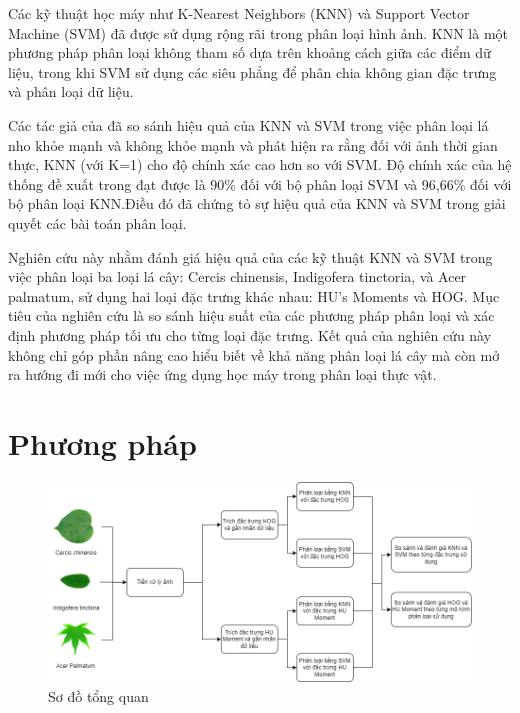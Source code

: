 \documentclass[a4paper]{article}
\begin{document}
Các kỹ thuật học máy như K-Nearest Neighbors (KNN) và Support Vector Machine (SVM) đã được sử dụng rộng rãi trong phân loại hình ảnh. KNN là một phương pháp phân loại không tham số dựa trên khoảng cách giữa các điểm dữ liệu, trong khi SVM sử dụng các siêu phẳng để phân chia không gian đặc trưng và phân loại dữ liệu.

Các tác giả của \cite{svm-and-knn} đã so sánh hiệu quả của KNN và SVM trong việc phân loại lá nho khỏe mạnh và không khỏe mạnh và phát hiện ra rằng đối với ảnh thời gian thực, KNN (với K=1) cho độ chính xác cao hơn so với SVM. Độ chính xác của hệ thống đề xuất trong \cite{svm-and-knn} đạt được là 90\% đối với bộ phân loại SVM và 96,66\% đối với bộ phân loại KNN.Điều đó đã chứng tỏ sự hiệu quả của KNN và SVM trong giải quyết các bài toán phân loại. 

Nghiên cứu này nhằm đánh giá hiệu quả của các kỹ thuật KNN và SVM trong việc phân loại ba loại lá cây: Cercis chinensis, Indigofera tinctoria, và Acer palmatum, sử dụng hai loại đặc trưng khác nhau: HU's Moments và HOG. Mục tiêu của nghiên cứu là so sánh hiệu suất của các phương pháp phân loại và xác định phương pháp tối ưu cho từng loại đặc trưng. Kết quả của nghiên cứu này không chỉ góp phần nâng cao hiểu biết về khả năng phân loại lá cây mà còn mở ra hướng đi mới cho việc ứng dụng học máy trong phân loại thực vật.

\section{Phương pháp}
\begin{figure}
    \centering
    \includegraphics[width=1\linewidth]{images/sodohethong.png}
    \caption{Sơ đồ tổng quan}
    \label{fig:sodohethong}
\end{figure}
\end{document}
